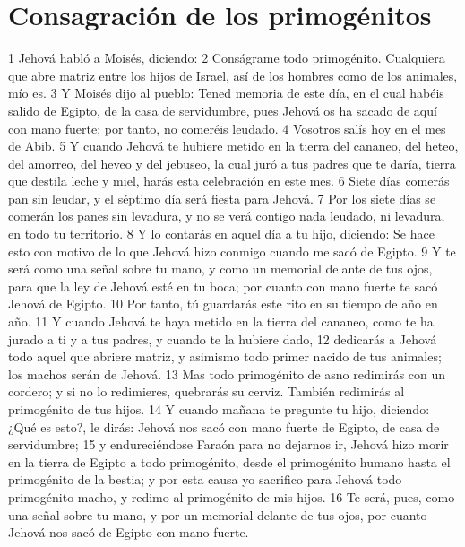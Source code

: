 \section*{Consagración de los primogénitos}
1 Jehová habló a Moisés, diciendo:
2 Conságrame todo primogénito. Cualquiera que abre matriz entre los hijos de Israel, así de los hombres como de los animales, mío es.
3 Y Moisés dijo al pueblo: Tened memoria de este día, en el cual habéis salido de Egipto, de la casa de servidumbre, pues Jehová os ha sacado de aquí con mano fuerte; por tanto, no comeréis leudado.
4 Vosotros salís hoy en el mes de Abib.
5 Y cuando Jehová te hubiere metido en la tierra del cananeo, del heteo, del amorreo, del heveo y del jebuseo, la cual juró a tus padres que te daría, tierra que destila leche y miel, harás esta celebración en este mes.
6 Siete días comerás pan sin leudar, y el séptimo día será fiesta para Jehová.
7 Por los siete días se comerán los panes sin levadura, y no se verá contigo nada leudado, ni levadura, en todo tu territorio.
8 Y lo contarás en aquel día a tu hijo, diciendo: Se hace esto con motivo de lo que Jehová hizo conmigo cuando me sacó de Egipto.
9 Y te será como una señal sobre tu mano, y como un memorial delante de tus ojos, para que la ley de Jehová esté en tu boca; por cuanto con mano fuerte te sacó Jehová de Egipto.
10 Por tanto, tú guardarás este rito en su tiempo de año en año.
11 Y cuando Jehová te haya metido en la tierra del cananeo, como te ha jurado a ti y a tus padres, y cuando te la hubiere dado,
12 dedicarás a Jehová todo aquel que abriere matriz, y asimismo todo primer nacido de tus animales; los machos serán de Jehová.
13 Mas todo primogénito de asno redimirás con un cordero; y si no lo redimieres, quebrarás su cerviz. También redimirás al primogénito de tus hijos.
14 Y cuando mañana te pregunte tu hijo, diciendo: ¿Qué es esto?, le dirás: Jehová nos sacó con mano fuerte de Egipto, de casa de servidumbre;
15 y endureciéndose Faraón para no dejarnos ir, Jehová hizo morir en la tierra de Egipto a todo primogénito, desde el primogénito humano hasta el primogénito de la bestia; y por esta causa yo sacrifico para Jehová todo primogénito macho, y redimo al primogénito de mis hijos.
16 Te será, pues, como una señal sobre tu mano, y por un memorial delante de tus ojos, por cuanto Jehová nos sacó de Egipto con mano fuerte.

